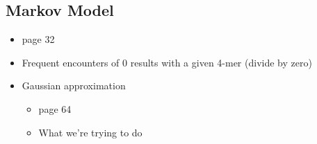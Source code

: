 \documentclass[12pt,notitlepage]{article}
\begin{document}
\begin{s5presentation}
\begin{ifhtml}
    \begin{s5slide}
      \section{Markov Model}
      \begin{itemize}
        \item page 32
        \item Frequent encounters of 0 results with a given 4-mer (divide by zero)
        \item Gaussian approximation
          \begin{itemize}
          \item page 64
          \item What we're trying to do
          \end{itemize}
      \end{itemize}
    \end{s5slide}
\end{ifhtml}  

  \W \end{s5presentation}
\end{document}
